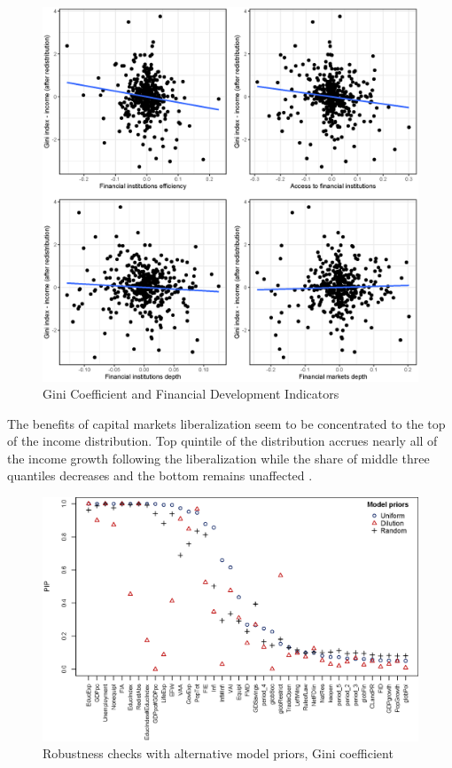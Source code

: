 \begin{refsection}
\begin{figure}
  \caption{Gini Coefficient and Financial Development Indicators}
  \label{ch4fig:gini_findev_dm}
  \includegraphics[width=\textwidth, keepaspectratio]{figures/ch4/plots_findev_gini_dm}
\end{figure}


The benefits of capital markets liberalization seem to be concentrated to the top of the income distribution. Top quintile of the distribution accrues nearly all of the income growth following the liberalization while the share of middle three quantiles decreases and the bottom remains unaffected \parencite{das2003income}.

\begin{figure}
  \caption{Robustness checks with alternative model priors, Gini coefficient}
  \label{ch4fig:gini_comp}
  \centering
  \includegraphics[width=\textwidth, keepaspectratio]{figures/ch4/model_priors_comparison_gini}
\end{figure}


\end{refsection}
